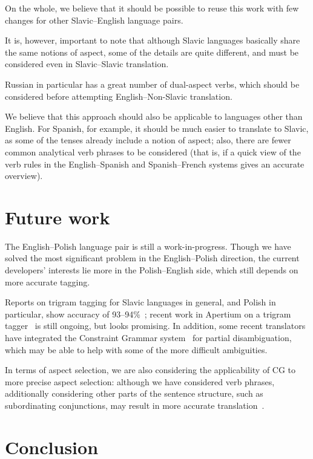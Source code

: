 \documentclass[11pt]{article}
\begin{document}
On the whole, we believe that it should be possible to reuse this
work with few changes for other Slavic--English language pairs.

It is, however, important to note that although Slavic languages
basically share the same notions of aspect, some of the details are
quite different, and must be considered even in Slavic--Slavic
translation.

Russian in particular has a great number of dual-aspect verbs, which
should be considered before attempting English--Non-Slavic translation.

We believe that this approach should also be applicable to languages
other than English. For Spanish, for example, it should be much easier
to translate to Slavic, as some of the tenses already include a notion
of aspect; also, there are fewer common analytical verb phrases to
be considered (that is, if a quick view of the verb rules in the
English--Spanish and Spanish--French systems gives an accurate overview).

\section{Future work}
The English--Polish language pair is still a work-in-progress. Though
we have solved the most significant problem in the English--Polish
direction, the current developers' interests lie more in the 
Polish--English side, which still depends on more accurate tagging.

Reports on trigram tagging for Slavic languages in general, and Polish in 
particular, show accuracy of 93--94\%~\citep{HajicKKOP01,Debowski04}; recent
work in Apertium on a trigram tagger~\citep{sheikh2009trigram} is still
ongoing, but looks promising. In addition, some recent translators
have integrated the Constraint Grammar system~\citep{karlsson1990cgf} for
partial disambiguation, which may be able to help with some of the
more difficult ambiguities.

In terms of aspect selection, we are also considering the applicability
of CG to more precise aspect selection: although we have considered
verb phrases, additionally considering other parts of the sentence 
structure, such as subordinating conjunctions, may result in more
accurate translation~\citep{kupsc03,kupsc03a}.

\section{Conclusion}
\end{document}
